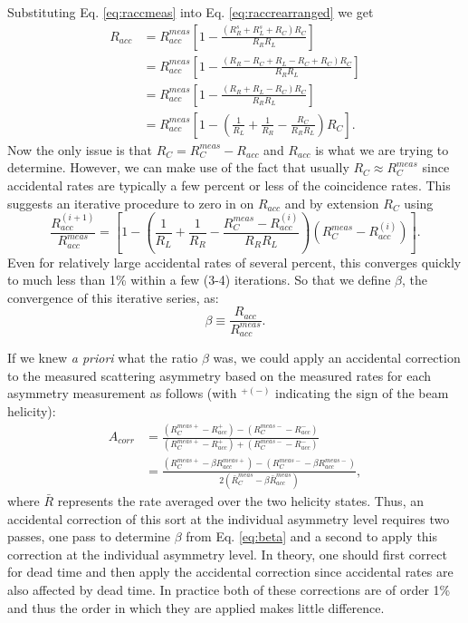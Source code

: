 \documentclass[12pt]{article}
\begin{document}
Substituting Eq. \ref{eq:raccmeas} into Eq. \ref{eq:raccrearranged} we get
\begin{align}
R_{acc}&=R_{acc}^{meas}\left[ 1-\frac{(R_R^s+R_L^s+R_C)R_C}{R_RR_L}\right]\\
             &=R_{acc}^{meas}\left[ 1- \frac{(R_R-R_C+R_L-R_C+R_C)R_C}{R_RR_L}\right]\\
             &=R_{acc}^{meas}\left[ 1- \frac{(R_R+R_L-R_C)R_C}{R_RR_L}\right]\\
             &=R_{acc}^{meas}\left[1-\left(\frac{1}{R_L}+ \frac{1}{R_R} - \frac{R_C}{R_RR_L}\right)R_C\right]\label{eq:beta}.
\end{align}
Now the only issue is that $R_C=R_C^{meas}-R_{acc}$ and $R_{acc}$ is what we are trying to determine. However, we can make use of the fact that usually $R_C\approx R_C^{meas}$ since accidental rates are typically a few percent or less of the coincidence rates. This suggests an iterative procedure to zero in on $R_{acc}$ and by extension $R_C$ using
\begin{equation}
\frac{R_{acc}^{(i+1)}}{R_{acc}^{meas}}=\left[1-\left(\frac{1}{R_L}+ \frac{1}{R_R} - \frac{R_C^{meas}-R_{acc}^{(i)}}{R_RR_L}\right)\left(R_C^{meas}-R_{acc}^{(i)}\right)\right].
\end{equation}
Even for relatively large accidental rates of several percent, this converges quickly to much less than 1\% within a few (3-4) iterations. So that we define $\beta$, the convergence of this iterative series, as:
\begin{equation}\label{eq:beta}
\beta\equiv\frac{R_{acc}}{R_{acc}^{meas}}.
\end{equation}

If we knew {\it a priori} what the ratio $\beta$ was, we could apply an accidental correction to the measured scattering asymmetry based on the measured rates for each asymmetry measurement as follows (with $^{+(-)}$ indicating the sign of the beam helicity):
\begin{align}
A_{corr}&=\frac{(R_C^{meas +}-R_{acc}^{+})-(R_C^{meas -}-R_{acc}^{-})}{(R_C^{meas +}-R_{acc}^{+})+(R_C^{meas -}-R_{acc}^{-})}\\
&=\frac{(R_C^{meas +}-\beta R_{acc}^{meas +})-(R_C^{meas -}-\beta R_{acc}^{meas -})}{2(\bar{R}_C^{meas}-\beta\bar{R}_{acc}^{meas})}\label{eq:acorr},
\end{align}
where $\bar{R}$ represents the rate averaged over the two helicity states. Thus, an accidental correction of this sort at the individual asymmetry level requires two passes, one pass to determine $\beta$ from Eq. \ref{eq:beta} and a second to apply this correction at the individual asymmetry level.  In theory, one should first correct for dead time and then apply the accidental correction since accidental rates are also affected by dead time. In practice both of these corrections are of order 1\% and thus the order in which they are applied makes little difference. 
\end{document}
